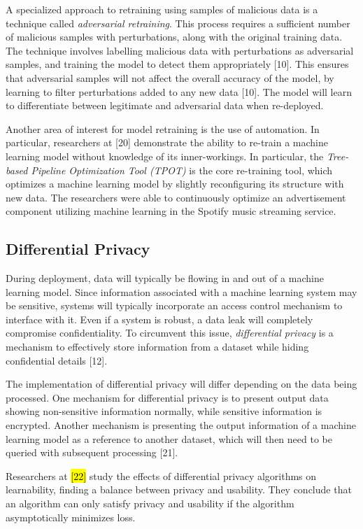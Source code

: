 \documentclass[11pt,conference]{IEEEtran}
\begin{document}
A specialized approach to retraining using samples of malicious data is a technique called
\emph{adversarial retraining}. This process requires  
a sufficient number of malicious samples with perturbations, along with the
original training data. The technique
involves labelling malicious data with perturbations as adversarial samples, and training
the model to detect them appropriately [10]. This ensures that adversarial samples will not affect
the overall accuracy of the model, by learning to filter perturbations added to
any new data [10]. The model will learn to differentiate between legitimate and
adversarial data when re-deployed.

Another area of interest for model retraining is the use of automation. In
particular, researchers at [20] demonstrate the ability to re-train a
machine learning model without knowledge of its inner-workings. In particular,
the \emph{Tree-based Pipeline Optimization Tool (TPOT)} is the core re-training
tool, which optimizes a machine learning model by slightly reconfiguring its
structure with new data. The researchers were able to continuously optimize an
advertisement component utilizing machine learning in the Spotify music
streaming service.

\subsection{Differential Privacy}
During deployment, data will typically be flowing in and out of a machine
learning model. Since information associated with a machine learning system may be
sensitive, systems will typically incorporate an access control mechanism to interface with it. Even if a system
is robust, a data leak will completely compromise confidentiality. To
circumvent this issue, \emph{differential privacy} is a mechanism to
effectively store
information from a dataset while hiding confidential details [12].

The implementation of differential privacy will differ depending on the data
being processed. One mechanism for differential privacy is to present
output data showing non-sensitive information normally, while sensitive
information is encrypted. Another mechanism is presenting the output
information of a machine learning model as a reference to another dataset, which
will then need to be queried with subsequent processing [21].

Researchers at \hl{[22]} study the effects of differential privacy algorithms on
learnability, finding a balance between privacy and usability. They conclude
that an algorithm can only satisfy privacy and usability if the algorithm
asymptotically minimizes loss.
\end{document}
